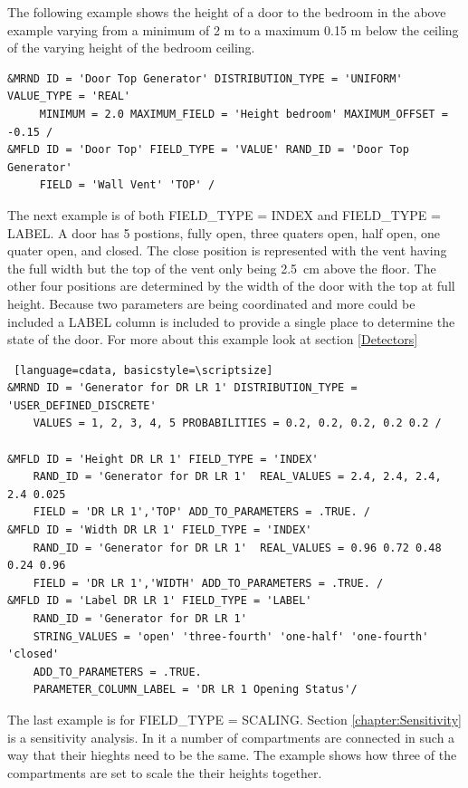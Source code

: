 \documentclass[12pt,twoside]{book}
\begin{document}
The following example shows the height of a door to the bedroom in the above example varying from a minimum of 2 m to a maximum 0.15 m below the ceiling of the varying height of the bedroom ceiling.

\begin{lstlisting}[language=cdata, basicstyle=\scriptsize]
&MRND ID = 'Door Top Generator' DISTRIBUTION_TYPE = 'UNIFORM' VALUE_TYPE = 'REAL'
     MINIMUM = 2.0 MAXIMUM_FIELD = 'Height bedroom' MAXIMUM_OFFSET = -0.15 /
&MFLD ID = 'Door Top' FIELD_TYPE = 'VALUE' RAND_ID = 'Door Top Generator'
     FIELD = 'Wall Vent' 'TOP' /
\end{lstlisting}

The next example is of both {\ct FIELD\_TYPE = INDEX} and {\ct FIELD\_TYPE = LABEL}. A door has 5 postions, fully open, three quaters open, half open, one quater open, and closed. The close position is represented with the vent having the full width but the top of the vent only being 2.5~cm above the floor. The other four positions are determined by the width of the door with the top at full height. Because two parameters are being coordinated and more could be included a {\ct LABEL} column is included to provide a single place to determine the state of the door. For more about this example look at section \ref{Detectors}

\vspace{\baselineskip}
\begin{lstlisting} [language=cdata, basicstyle=\scriptsize]
&MRND ID = 'Generator for DR LR 1' DISTRIBUTION_TYPE = 'USER_DEFINED_DISCRETE'
	VALUES = 1, 2, 3, 4, 5 PROBABILITIES = 0.2, 0.2, 0.2, 0.2 0.2 /

&MFLD ID = 'Height DR LR 1' FIELD_TYPE = 'INDEX'
	RAND_ID = 'Generator for DR LR 1'  REAL_VALUES = 2.4, 2.4, 2.4, 2.4 0.025
	FIELD = 'DR LR 1','TOP' ADD_TO_PARAMETERS = .TRUE. /
&MFLD ID = 'Width DR LR 1' FIELD_TYPE = 'INDEX'
	RAND_ID = 'Generator for DR LR 1'  REAL_VALUES = 0.96 0.72 0.48 0.24 0.96
	FIELD = 'DR LR 1','WIDTH' ADD_TO_PARAMETERS = .TRUE. /
&MFLD ID = 'Label DR LR 1' FIELD_TYPE = 'LABEL'
	RAND_ID = 'Generator for DR LR 1'
	STRING_VALUES = 'open' 'three-fourth' 'one-half' 'one-fourth' 'closed'
	ADD_TO_PARAMETERS = .TRUE.
	PARAMETER_COLUMN_LABEL = 'DR LR 1 Opening Status'/
\end{lstlisting}

The last example is for {\ct FIELD\_TYPE = SCALING}. Section \ref{chapter:Sensitivity} is a sensitivity analysis. In it a number of compartments are connected in such a way that their hieghts need to be the same. The example shows how three of the compartments are set to scale the their heights together.
\end{document}
